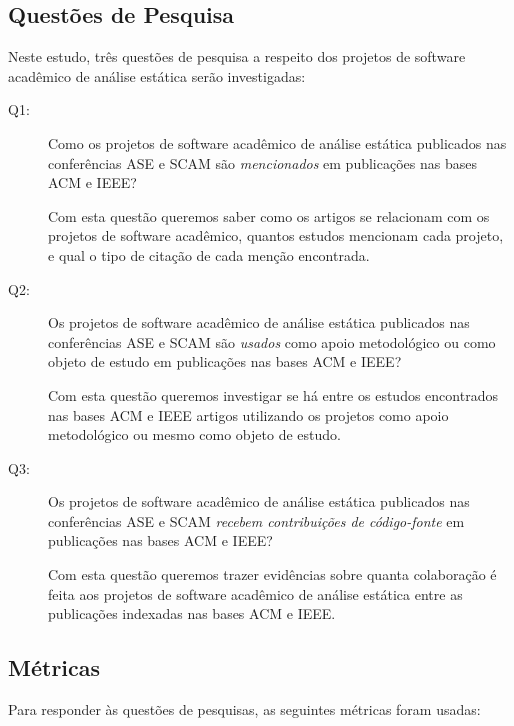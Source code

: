 \subsection{Questões de Pesquisa}

Neste estudo, três questões de pesquisa a respeito dos projetos de
software acadêmico de análise estática serão investigadas:

\newcommand{\EstudoDoisQuestaoUm}{
  Como os projetos de software acadêmico de análise estática publicados nas
  conferências ASE e SCAM são \textit{mencionados} em publicações nas bases ACM e IEEE?
}
\newcommand{\EstudoDoisQuestaoDois}{
  Os projetos de software acadêmico de análise estática publicados nas
  conferências ASE e SCAM são \textit{usados} como apoio metodológico ou como
  objeto de estudo em publicações nas bases ACM e IEEE?
}
\newcommand{\EstudoDoisQuestaoTres}{
  Os projetos de software acadêmico de análise estática publicados nas
  conferências ASE e SCAM \textit{recebem contribuições de código-fonte} em publicações
  nas bases ACM e IEEE?
}

\begin{description}
  \item [Q1:] \EstudoDoisQuestaoUm

    Com esta questão queremos saber como os artigos se relacionam com os projetos
    de software acadêmico, quantos estudos mencionam cada projeto, e qual o tipo
    de citação de cada menção encontrada.

  \item [Q2:] \EstudoDoisQuestaoDois

    Com esta questão queremos investigar se há entre os estudos encontrados nas bases
    ACM e IEEE artigos utilizando os projetos como apoio metodológico ou mesmo como
    objeto de estudo.

  \item [Q3:] \EstudoDoisQuestaoTres

    Com esta questão queremos trazer evidências sobre quanta colaboração é
    feita aos projetos de software acadêmico de análise estática entre as
    publicações indexadas nas bases ACM e IEEE.

\end{description}

\subsection{Métricas}

Para responder às questões de pesquisas, as seguintes métricas foram usadas:

